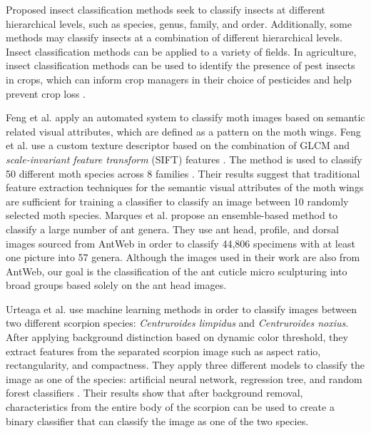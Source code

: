 \documentclass{aci}
\numberwithin{equation}{section}
\begin{document}
Proposed insect classification methods seek to classify insects at different
hierarchical levels, such as species, genus, family, and order. Additionally,
some methods may classify insects at a combination of different hierarchical
levels. Insect classification methods can be applied to a variety of fields. In
agriculture, insect classification methods can be used to identify the presence
of pest insects in crops, which can inform crop managers in their choice of
pesticides and help prevent crop loss \cite{liu_pestnet_2019,
    kasinathan_machine_2021}.

Feng et al. \cite{feng_automated_2013} apply an automated system to classify
moth images based on semantic related visual attributes, which are defined as a
pattern on the moth wings. Feng et al. \cite{feng_automated_2013} use a custom
texture descriptor based on the combination of GLCM and \textit{scale-invariant
    feature transform} (SIFT) features \cite{gotlieb_texture_1990,
    lowe_distinctive_2004}. The method is used to classify 50 different moth species
across 8 families \cite{feng_automated_2013}. Their results
\cite{feng_automated_2013} suggest that traditional feature extraction
techniques for the semantic visual attributes of the moth wings are sufficient
for training a classifier to classify an image between 10 randomly selected moth
species. Marques et al. \cite{marques_ant_2018} propose an ensemble-based method
to classify a large number of ant genera. They use ant head, profile, and dorsal
images sourced from AntWeb in order to classify 44,806 specimens with at least
one picture into 57 genera. Although the images used in their work are also from
AntWeb, our goal is the classification of the ant cuticle micro sculpturing into
broad groups based solely on the ant head images.

Urteaga et al. \cite{urteaga_scorpions_2016} use machine learning methods in
order to classify images between two different scorpion species:
\textit{Centruroides limpidus} and \textit{Centruroides noxius}. After applying
background distinction based on dynamic color threshold, they extract features
from the separated scorpion image such as aspect ratio, rectangularity, and
compactness. They apply three different models to classify the image as one of
the species: artificial neural network, regression tree, and random forest
classifiers \cite{urteaga_scorpions_2016}. Their results show that after
background removal, characteristics from the entire body of the scorpion can be
used to create a binary classifier that can classify the image as one of the two
species.
\end{document}
